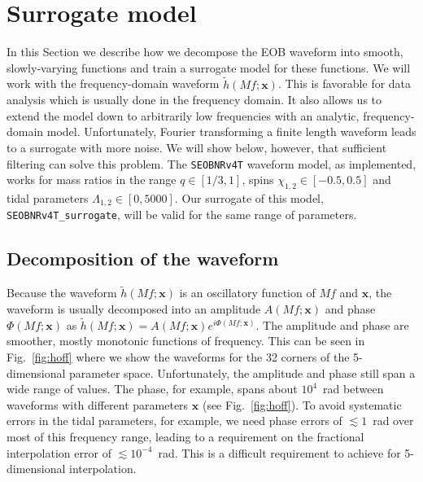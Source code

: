 \documentclass[prd,aps,letter,twocolumn,floatfix,notitlepage,nofootinbib]{revtex4-1}
\def\bx{\mathbf{x}}
\begin{document}
\section{Surrogate model}
\label{sec:surrogate}

In this Section we describe how we decompose the EOB waveform into smooth, slowly-varying functions and train a surrogate model for these functions. We will work with the frequency-domain waveform $\tilde h(Mf; \bx)$. This is favorable for data analysis which is usually done in the frequency domain. It also allows us to extend the model down to arbitrarily low frequencies with an analytic, frequency-domain model. Unfortunately, Fourier transforming a finite length waveform leads to a surrogate with more noise. We will show below, however, that sufficient filtering can solve this problem. The \texttt{SEOBNRv4T} waveform model, as implemented, works for mass ratios in the range $q \in [1/3, 1]$, spins $\chi_{1,2} \in [-0.5, 0.5]$ and tidal parameters $\Lambda_{1,2} \in [0, 5000]$. Our surrogate of this model, \texttt{SEOBNRv4T\_surrogate}, will be valid for the same range of parameters.


\subsection{Decomposition of the waveform}

Because the waveform $\tilde h(Mf; \bx)$ is an oscillatory function of $Mf$ and $\bx$, the waveform is usually decomposed into an amplitude $A(Mf; \bx)$ and phase $\Phi(Mf; \bx)$ as $\tilde h(Mf; \bx) = A(Mf; \bx) e^{i\Phi(Mf; \bx)}$. The amplitude and phase are smoother, mostly monotonic functions of frequency. 
This can be seen in Fig.~\ref{fig:hoff} where we show the waveforms for the 32 corners of the 5-dimensional parameter space. Unfortunately, the amplitude and phase still span a wide range of values. The phase, for example, spans about $10^4$~rad between waveforms with different parameters $\bx$ (see Fig.~\ref{fig:hoff}). To avoid systematic errors in the tidal parameters, for example, we need phase errors of $\lesssim 1$~rad over most of this frequency range, leading to a requirement on the fractional interpolation error of $\lesssim 10^{-4}$~rad. This is a difficult requirement to achieve for 5-dimensional interpolation. 
\end{document}
